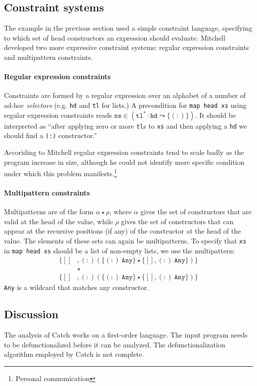 \documentclass[a4paper]{report}
\begin{document}
\subsection{Constraint systems}
The example in the previous section used a simple constraint language, specifying to which set of head constructors an expression should evaluate. Mitchell developed two more expressive constraint systems: regular expression constraints and multipattern constraints.

\paragraph{Regular expression constraints} Constraints are formed by a regular expression over an alphabet of a number of ad-hoc \emph{selectors} (e.g. \texttt{hd} and \texttt{tl} for lists.) A precondition for \texttt{map head xs} using regular expression constraints reads $\texttt{xs} \in (\texttt{tl}^{*} \cdot \texttt{hd} \leadsto \{(:)\})$. It should be interpreted as ``after applying zero or more \texttt{tl}s to \texttt{xs} and then applying a \texttt{hd} we should find a \texttt{(:)} constructor.''

Accoriding to Mitchell regular expression constraints tend to scale badly as the program increase in size, although he could not identify more specific condition under which this problem manifests.\footnote{Personal communication}

\paragraph{Multipattern constraints} Multipatterns are of the form $\alpha \star \rho$, where $\alpha$ gives the set of constructors that are valid at the head of the value, while $\rho$ gives the set of constructors that can appear at the recursive positions (if any) of the constructor at the head of the value. The elements of these sets can again be multipatterns. To specify that \texttt{xs} in \texttt{map head xs} should be a list of non-empty lists, we use the multipattern:
\begin{align*}
\{[]&, (:) (\{(:)\ \texttt{Any} \} \star \{ [], (:)\ \texttt{Any}\})\} \\
&\star \\
\{[]&, (:) (\{(:)\ \texttt{Any} \} \star \{ [], (:)\ \texttt{Any}\})\}
\end{align*}
\texttt{Any} is a wildcard that matches any constructor.

\subsection{Discussion}
The analysis of Catch works on a first-order language. The input program needs to be defunctionalized before it can be analyzed. The defunctionalization algorithm employed by Catch is not complete.
\end{document}
